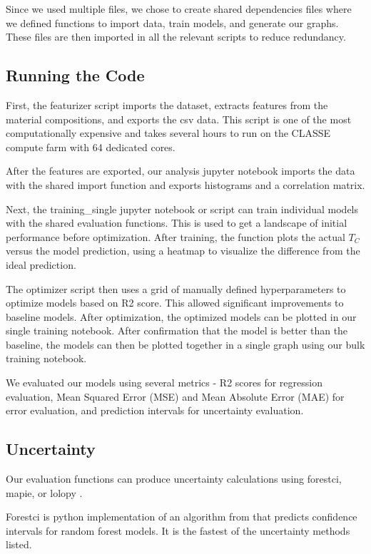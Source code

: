 \documentclass[twocolumn, nofootinbib, secnumarabic, amssymb, nobibnotes, aps, prd]{revtex4-2}
\begin{document}
Since we used multiple files, we chose to create shared dependencies files where we defined functions to import data, train models, and generate our graphs. These files are then imported in all the relevant scripts to reduce redundancy.

\subsection{Running the Code}

First, the featurizer script imports the dataset, extracts features from the material compositions, and exports the csv data. This script is one of the most computationally expensive and takes several hours to run on the CLASSE compute farm with 64 dedicated cores.

After the features are exported, our analysis jupyter notebook imports the data with the shared import function and exports histograms and a correlation matrix. 

Next, the training\_single jupyter notebook or script can train individual models with the shared evaluation functions. This is used to get a landscape of initial performance before optimization. After training, the function plots the actual $T_C$ versus the model prediction, using a heatmap to visualize the difference from the ideal prediction.

The optimizer script then uses a grid of manually defined hyperparameters to optimize models based on R2 score. This allowed significant improvements to baseline models. After optimization, the optimized models can be plotted in our single training notebook. After confirmation that the model is better than the baseline, the models can then be plotted together in a single graph using our bulk training notebook. 

We evaluated our models using several metrics - R2 scores for regression evaluation, Mean Squared Error (MSE) and Mean Absolute Error (MAE) for error evaluation, and prediction intervals for uncertainty evaluation.

\subsection{Uncertainty}\label{sec:uncertainty}
Our evaluation functions can produce uncertainty calculations using forestci, mapie, or lolopy \cite{Polimis2017, Taquet2022, Hutchinson2022}. 

Forestci is python implementation of an algorithm from \cite{Wager2014} that predicts confidence intervals for random forest models. It is the fastest of the uncertainty methods listed. 
\end{document}
